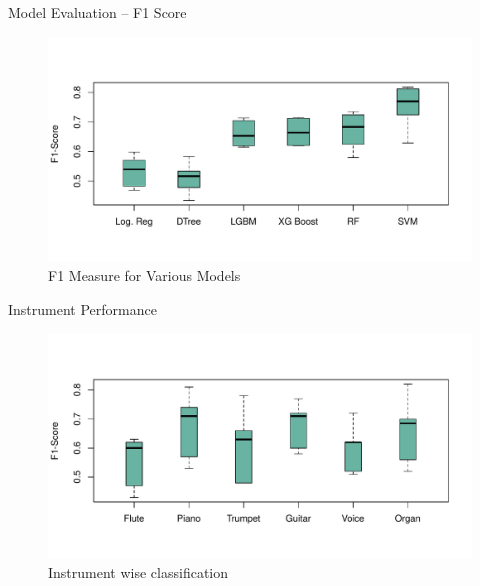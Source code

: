 \documentclass[11pt]{beamer}
\begin{document}
\begin{frame}{Model Evaluation -- F1 Score}
	
	\begin{figure}
		\centering
		\includegraphics[width=\linewidth]{f1}
		\caption{F1 Measure for Various Models}
		\label{fig:f1}
	\end{figure}
\end{frame}


\begin{frame}{Instrument Performance}
	
	\begin{figure}
		\centering
		\includegraphics[width=0.95\linewidth]{instr-f1}
		\caption{Instrument wise classification}
		\label{fig:instr-f1}
	\end{figure}
	
	
\end{frame}
\end{document}
